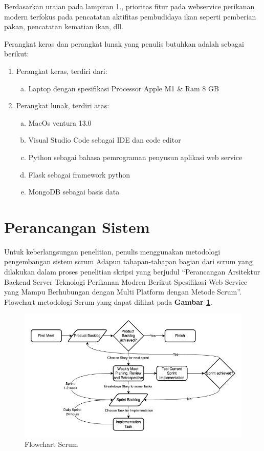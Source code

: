 Berdasarkan uraian pada lampiran 1., prioritas fitur pada webservice perikanan modern terfokus pada pencatatan aktifitas pembudidaya ikan seperti pemberian pakan, pencatatan kematian ikan, dll.

Perangkat keras dan perangkat lunak yang penulis butuhkan adalah sebagai berikut:

\begin{enumerate}
\item Perangkat keras, terdiri dari:
\begin{enumerate} [a.]
\item Laptop dengan spesifikasi Processor Apple M1 \& Ram 8 GB
\end{enumerate}
\item Perangkat lunak, terdiri atas:
\begin{enumerate} [a.]
\item MacOs ventura 13.0
\item Visual Studio Code sebagai IDE dan code editor
\item Python sebagai bahasa pemrograman penyusun aplikasi web service
\item Flask sebagai framework python
\item MongoDB sebagai basis data
\end{enumerate}
\end{enumerate}

\section{Perancangan Sistem}

Untuk keberlangsungan penelitian, penulis menggunakan metodologi pengembangan sistem scrum Adapun tahapan-tahapan bagian dari scrum yang dilakukan dalam proses penelitian skripsi yang berjudul “Perancangan Arsitektur Backend Server Teknologi Perikanan Modren Berikut Spesifikasi Web Service yang Mampu Berhubungan dengan Multi Platform dengan Metode Scrum”. Flowchart metodologi Scrum yang dapat dilihat pada \textbf{Gambar \ref{fig:flowchart_scrum}}.

\begin{figure}[H]
	\centering
	\includegraphics[height=0.6\textwidth]{gambar/design_penelitian_revisi.png}
	\caption{Flowchart Scrum}
	\label{fig:flowchart_scrum}
\end{figure}

